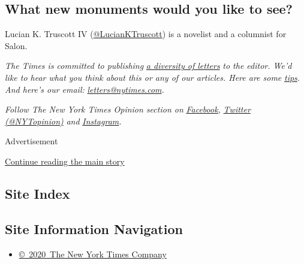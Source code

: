 \hypertarget{what-new-monuments-would-you-like-to-see}{%
\subsection{What new monuments would you like to
see?}\label{what-new-monuments-would-you-like-to-see}}

Lucian K. Truscott IV
(\href{https://twitter.com/LucianKTruscott}{@LucianKTruscott}) is a
novelist and a columnist for Salon.

\emph{The Times is committed to publishing}
\href{https://www.nytimes.com/2019/01/31/opinion/letters/letters-to-editor-new-york-times-women.html}{\emph{a
diversity of letters}} \emph{to the editor. We'd like to hear what you
think about this or any of our articles. Here are some}
\href{https://help.nytimes.com/hc/en-us/articles/115014925288-How-to-submit-a-letter-to-the-editor}{\emph{tips}}\emph{.
And here's our email:}
\href{mailto:letters@nytimes.com}{\emph{letters@nytimes.com}}\emph{.}

\emph{Follow The New York Times Opinion section on}
\href{https://www.facebook.com/nytopinion}{\emph{Facebook}}\emph{,}
\href{http://twitter.com/NYTOpinion}{\emph{Twitter (@NYTopinion)}}
\emph{and}
\href{https://www.instagram.com/nytopinion/}{\emph{Instagram}}\emph{.}

Advertisement

\protect\hyperlink{after-bottom}{Continue reading the main story}

\hypertarget{site-index}{%
\subsection{Site Index}\label{site-index}}

\hypertarget{site-information-navigation}{%
\subsection{Site Information
Navigation}\label{site-information-navigation}}

\begin{itemize}
\tightlist
\item
  \href{https://help.nytimes.com/hc/en-us/articles/115014792127-Copyright-notice}{©~2020~The
  New York Times Company}
\end{itemize}

